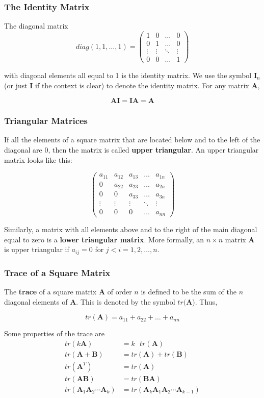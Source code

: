 \documentclass{beamer}
\begin{document}
\begin{frame}
\frametitle{The Identity Matrix}
The diagonal matrix
\[diag(1,1,\hdots, 1) = 
\begin{pmatrix}
    1 & 0 & \dots  & 0 \\
    0 & 1  & \dots  & 0 \\
    \vdots & \vdots  & \ddots & \vdots \\
    0 & 0  & \dots  & 1
\end{pmatrix}
\]

with diagonal elements all equal to 1 is the identity matrix.  We use the symbol $\mathbf{I}_n$ (or just $\mathbf{I}$ if the context is clear) to denote the identity matrix.  For any matrix $\mathbf{A}$,

\[\mathbf{AI} = \mathbf{IA} = \mathbf{A}\]
\end{frame}

\begin{frame}
\frametitle{Triangular Matrices}
If all the elements of a square matrix that are located below and to the left of the diagonal are 0, then the matrix is called \textbf{upper triangular}.  An upper triangular matrix looks like this:

\[\begin{pmatrix}
    a_{11} & a_{12} & a_{13}& \dots  & a_{1n} \\
    0 & a_{22}  & a_{23} & \dots  & a_{2n} \\
        0 & 0  & a_{33} & \dots  & a_{3n} \\
    \vdots & \vdots & \vdots  & \ddots & \vdots \\
    0 & 0  & 0 & \dots  & a_{nn}
\end{pmatrix}
\]

Similarly, a matrix with all elements above and to the right of the main diagonal equal to zero is a \textbf{lower triangular matrix}.  More formally, an $n \times n$ matrix $\mathbf{A}$ is upper triangular if $a_{ij} = 0$ for $j < i = 1, 2, \hdots, n$.  
\end{frame}

\begin{frame}
\frametitle{Trace of a Square Matrix}
The \textbf{trace} of a square matrix $\mathbf{A}$ of order $n$ is defined to be the sum of the $n$ diagonal elements of $\mathbf{A}$.  This is denoted by the symbol $tr(\mathbf{A}$).  Thus,

\[tr(\mathbf{A}) = a_{11} + a_{22} + \hdots + a_{nn}\]

Some properties of the trace are
\begin{align*}
tr(k\mathbf{A}) &= k\text{ }tr(\mathbf{A}) \\
tr(\mathbf{A} + \mathbf{B}) &= tr(\mathbf{A})+ tr(\mathbf{B}) \\
tr(\mathbf{A}^T) &= tr(\mathbf{A}) \\
tr(\mathbf{AB}) &= tr(\mathbf{BA}) \\
tr(\mathbf{A}_1\mathbf{A}_2\cdots\mathbf{A}_k) &= tr(\mathbf{A}_k\mathbf{A}_1\mathbf{A}_2\cdots \mathbf{A}_{k-1})
\end{align*}
\end{frame}
\end{document}
